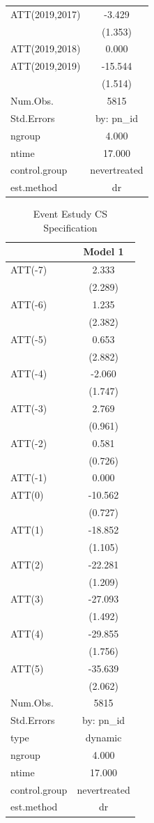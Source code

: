 \documentclass[
  12pt,
]{article}
\begin{document}
\begin{table}
\begin{tabular}[t]{lc}
ATT(2019,2017) & -3.429\\
 & (1.353)\\
ATT(2019,2018) & 0.000\\
ATT(2019,2019) & -15.544\\
 & (1.514)\\
\midrule
Num.Obs. & 5815\\
Std.Errors & by: pn\_id\\
ngroup & 4.000\\
ntime & 17.000\\
control.group & nevertreated\\
est.method & dr\\
\bottomrule
\end{tabular}
\end{table}

\begin{table}

\caption{\label{tab:Tab-7}Event Estudy CS Specification}
\centering
\begin{tabular}[t]{lc}
\toprule
  & Model 1\\
\midrule
ATT(-7) & 2.333\\
 & (2.289)\\
ATT(-6) & 1.235\\
 & (2.382)\\
ATT(-5) & 0.653\\
 & (2.882)\\
ATT(-4) & -2.060\\
 & (1.747)\\
ATT(-3) & 2.769\\
 & (0.961)\\
ATT(-2) & 0.581\\
 & (0.726)\\
ATT(-1) & 0.000\\
ATT(0) & -10.562\\
 & (0.727)\\
ATT(1) & -18.852\\
 & (1.105)\\
ATT(2) & -22.281\\
 & (1.209)\\
ATT(3) & -27.093\\
 & (1.492)\\
ATT(4) & -29.855\\
 & (1.756)\\
ATT(5) & -35.639\\
 & (2.062)\\
\midrule
Num.Obs. & 5815\\
Std.Errors & by: pn\_id\\
type & dynamic\\
ngroup & 4.000\\
ntime & 17.000\\
control.group & nevertreated\\
est.method & dr\\
\bottomrule
\end{tabular}
\end{table}
\end{document}
